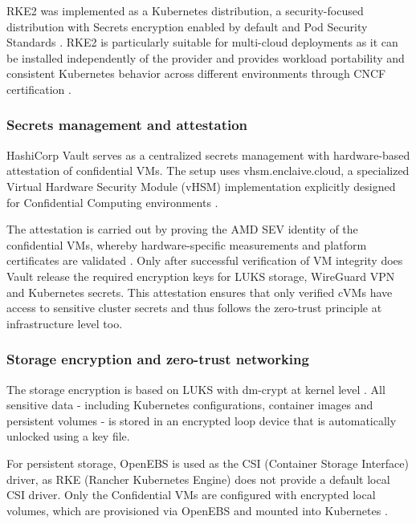 RKE2 was implemented as a Kubernetes distribution, a security-focused distribution with Secrets encryption enabled by default and Pod Security Standards \parencite{rke2_docs_2025, kubernetes_security_2025}. RKE2 is particularly suitable for multi-cloud deployments as it can be installed independently of the provider and provides workload portability and consistent Kubernetes behavior across different environments through CNCF certification \parencite{rancher_government_2024, cncf_2024}.

\subsubsection{Secrets management and attestation}

HashiCorp Vault serves as a centralized secrets management with hardware-based attestation of confidential VMs. The setup uses vhsm.enclaive.cloud, a specialized Virtual Hardware Security Module (vHSM) implementation explicitly designed for Confidential Computing environments \parencite{enclaive_vhsm_2025}.

The attestation is carried out by proving the AMD SEV identity of the confidential VMs, whereby hardware-specific measurements and platform certificates are validated \parencite{kaplan_amd_encryption_2016, confidential_computing_consortium_2024}. Only after successful verification of VM integrity does Vault release the required encryption keys for LUKS storage, WireGuard VPN and Kubernetes secrets. This attestation ensures that only verified cVMs have access to sensitive cluster secrets and thus follows the zero-trust principle at infrastructure level too.

\subsubsection{Storage encryption and zero-trust networking}

The storage encryption is based on LUKS with dm-crypt at kernel level \parencite{fruhwirth_luks_2005, luks2_spec_2024}. All sensitive data - including Kubernetes configurations, container images and persistent volumes - is stored in an encrypted loop device that is automatically unlocked using a key file. 

For persistent storage, OpenEBS is used as the CSI (Container Storage Interface) driver, as RKE (Rancher Kubernetes Engine) does not provide a default local CSI driver. Only the Confidential VMs are configured with encrypted local volumes, which are provisioned via OpenEBS and mounted into Kubernetes \parencite{openebs_docs_2025}.

